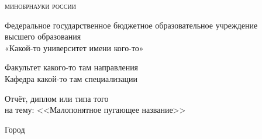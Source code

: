 \begin{center}
  \large
  \textsc{минобрнауки россии}\\


  Федеральное государственное бюджетное образовательное учреждение\\
  высшего образования\\
  «Какой-то университет имени кого-то»\\


  Факультет какого-то там направления\\
  Кафедра какой-то там специализации\\


  \huge Отчёт, диплом или типа того \\

  \large на тему:  <<Малопонятное пугающее название>>\\
\end{center}


\noindent
{}
\hfill
{}


\begin{center}
\large{Город \the\year}
\end{center}

\thispagestyle{empty}
